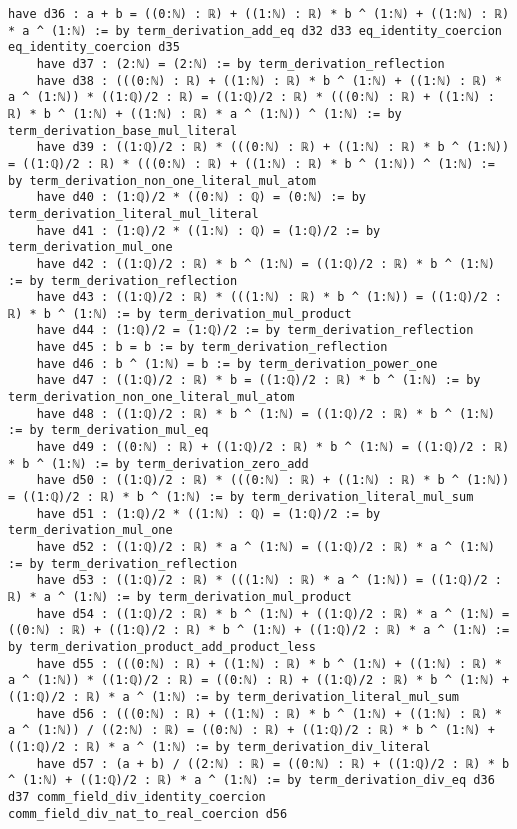 \documentclass{article}
\begin{document}
\begin{tcolorbox}[colback=white!10, width=\linewidth]
\begin{lstlisting}[language=Lean4]
    have d36 : a + b = ((0:ℕ) : ℝ) + ((1:ℕ) : ℝ) * b ^ (1:ℕ) + ((1:ℕ) : ℝ) * a ^ (1:ℕ) := by term_derivation_add_eq d32 d33 eq_identity_coercion eq_identity_coercion d35
    have d37 : (2:ℕ) = (2:ℕ) := by term_derivation_reflection
    have d38 : (((0:ℕ) : ℝ) + ((1:ℕ) : ℝ) * b ^ (1:ℕ) + ((1:ℕ) : ℝ) * a ^ (1:ℕ)) * ((1:ℚ)/2 : ℝ) = ((1:ℚ)/2 : ℝ) * (((0:ℕ) : ℝ) + ((1:ℕ) : ℝ) * b ^ (1:ℕ) + ((1:ℕ) : ℝ) * a ^ (1:ℕ)) ^ (1:ℕ) := by term_derivation_base_mul_literal
    have d39 : ((1:ℚ)/2 : ℝ) * (((0:ℕ) : ℝ) + ((1:ℕ) : ℝ) * b ^ (1:ℕ)) = ((1:ℚ)/2 : ℝ) * (((0:ℕ) : ℝ) + ((1:ℕ) : ℝ) * b ^ (1:ℕ)) ^ (1:ℕ) := by term_derivation_non_one_literal_mul_atom
    have d40 : (1:ℚ)/2 * ((0:ℕ) : ℚ) = (0:ℕ) := by term_derivation_literal_mul_literal
    have d41 : (1:ℚ)/2 * ((1:ℕ) : ℚ) = (1:ℚ)/2 := by term_derivation_mul_one
    have d42 : ((1:ℚ)/2 : ℝ) * b ^ (1:ℕ) = ((1:ℚ)/2 : ℝ) * b ^ (1:ℕ) := by term_derivation_reflection
    have d43 : ((1:ℚ)/2 : ℝ) * (((1:ℕ) : ℝ) * b ^ (1:ℕ)) = ((1:ℚ)/2 : ℝ) * b ^ (1:ℕ) := by term_derivation_mul_product
    have d44 : (1:ℚ)/2 = (1:ℚ)/2 := by term_derivation_reflection
    have d45 : b = b := by term_derivation_reflection
    have d46 : b ^ (1:ℕ) = b := by term_derivation_power_one
    have d47 : ((1:ℚ)/2 : ℝ) * b = ((1:ℚ)/2 : ℝ) * b ^ (1:ℕ) := by term_derivation_non_one_literal_mul_atom
    have d48 : ((1:ℚ)/2 : ℝ) * b ^ (1:ℕ) = ((1:ℚ)/2 : ℝ) * b ^ (1:ℕ) := by term_derivation_mul_eq
    have d49 : ((0:ℕ) : ℝ) + ((1:ℚ)/2 : ℝ) * b ^ (1:ℕ) = ((1:ℚ)/2 : ℝ) * b ^ (1:ℕ) := by term_derivation_zero_add
    have d50 : ((1:ℚ)/2 : ℝ) * (((0:ℕ) : ℝ) + ((1:ℕ) : ℝ) * b ^ (1:ℕ)) = ((1:ℚ)/2 : ℝ) * b ^ (1:ℕ) := by term_derivation_literal_mul_sum
    have d51 : (1:ℚ)/2 * ((1:ℕ) : ℚ) = (1:ℚ)/2 := by term_derivation_mul_one
    have d52 : ((1:ℚ)/2 : ℝ) * a ^ (1:ℕ) = ((1:ℚ)/2 : ℝ) * a ^ (1:ℕ) := by term_derivation_reflection
    have d53 : ((1:ℚ)/2 : ℝ) * (((1:ℕ) : ℝ) * a ^ (1:ℕ)) = ((1:ℚ)/2 : ℝ) * a ^ (1:ℕ) := by term_derivation_mul_product
    have d54 : ((1:ℚ)/2 : ℝ) * b ^ (1:ℕ) + ((1:ℚ)/2 : ℝ) * a ^ (1:ℕ) = ((0:ℕ) : ℝ) + ((1:ℚ)/2 : ℝ) * b ^ (1:ℕ) + ((1:ℚ)/2 : ℝ) * a ^ (1:ℕ) := by term_derivation_product_add_product_less
    have d55 : (((0:ℕ) : ℝ) + ((1:ℕ) : ℝ) * b ^ (1:ℕ) + ((1:ℕ) : ℝ) * a ^ (1:ℕ)) * ((1:ℚ)/2 : ℝ) = ((0:ℕ) : ℝ) + ((1:ℚ)/2 : ℝ) * b ^ (1:ℕ) + ((1:ℚ)/2 : ℝ) * a ^ (1:ℕ) := by term_derivation_literal_mul_sum
    have d56 : (((0:ℕ) : ℝ) + ((1:ℕ) : ℝ) * b ^ (1:ℕ) + ((1:ℕ) : ℝ) * a ^ (1:ℕ)) / ((2:ℕ) : ℝ) = ((0:ℕ) : ℝ) + ((1:ℚ)/2 : ℝ) * b ^ (1:ℕ) + ((1:ℚ)/2 : ℝ) * a ^ (1:ℕ) := by term_derivation_div_literal
    have d57 : (a + b) / ((2:ℕ) : ℝ) = ((0:ℕ) : ℝ) + ((1:ℚ)/2 : ℝ) * b ^ (1:ℕ) + ((1:ℚ)/2 : ℝ) * a ^ (1:ℕ) := by term_derivation_div_eq d36 d37 comm_field_div_identity_coercion comm_field_div_nat_to_real_coercion d56

\end{lstlisting}
\end{tcolorbox}
\end{document}
